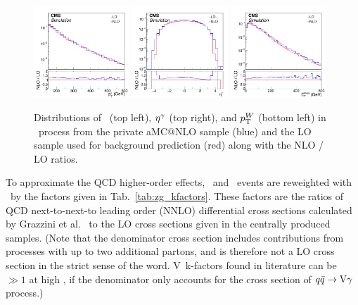 \begin{figure}[htbp]
  \centering
  \includegraphics[width=0.32\textwidth]{Analysis/Figures/kfactor/WG_ptg.pdf}
  \includegraphics[width=0.32\textwidth]{Analysis/Figures/kfactor/WG_etag.pdf}
  \includegraphics[width=0.32\textwidth]{Analysis/Figures/kfactor/WG_met.pdf}
  \caption{
    Distributions of \ETg\ (top left), $\eta^{\gamma}$ (top right), and $p_{\mathrm{T}}^{{W}}$ (bottom left) in \wlng\ process from the private aMC@NLO sample (blue) and the LO sample used for background prediction (red) along with the NLO / LO ratios.
  }
  \label{fig:wg_nlo_lo}
\end{figure}

To approximate the QCD higher-order effects, \zinvg\ and \wlng\ events are reweighted with \ETg\ by the factors given in Tab.~\ref{tab:zg_kfactors}. 
These factors are the ratios of QCD next-to-next-to leading order (NNLO) differential cross sections calculated by Grazzini et al.~\cite{Bozzi:2010xn} to the LO cross sections given in the centrally produced samples. 
(Note that the denominator cross section includes contributions from processes with up to two additional partons, and is therefore not a LO cross section in the strict sense of the word. V\Pgg\ k-factors found in literature can be $\gg 1$ at high \ETg, if the denominator only accounts for the cross section of ${q}\bar{{q}}\rightarrow\mathrm{V}\gamma$ process.)

